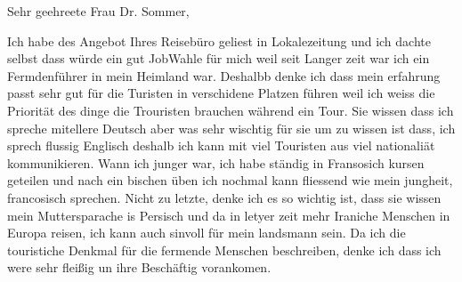 \documentclass[a4paper]{article}
\title{}
\date{}
\begin{document}
\maketitle
    Sehr geehreete Frau Dr. Sommer,

    Ich habe des Angebot Ihres Reisebüro geliest in Lokalezeitung und ich dachte selbst dass würde ein gut JobWahle für mich weil seit Langer zeit war ich ein Fermdenführer in mein Heimland war. Deshalbb denke ich dass mein erfahrung passt sehr gut für die Turisten in verschidene Platzen führen weil ich weiss die Priorität des dinge die Trouristen brauchen während ein Tour. Sie wissen dass ich spreche mitellere Deutsch aber was sehr wischtig für sie um zu wissen ist dass, ich sprech flussig Englisch deshalb ich kann mit viel Touristen aus viel nationaliät kommunikieren. Wann ich junger war, ich habe ständig in Fransosich kursen geteilen und nach ein bischen üben ich nochmal kann fliessend wie mein jungheit, francosisch sprechen. Nicht zu letzte, denke ich es so wichtig ist, dass sie wissen mein Muttersparache is Persisch und da in letyer zeit mehr Iraniche Menschen in Europa reisen, ich kann auch sinvoll für mein landsmann sein. Da ich die touristiche Denkmal für die fermende Menschen beschreiben, denke ich dass ich were sehr fleißig un ihre Beschäftig vorankomen.
    
    
\end{document}
